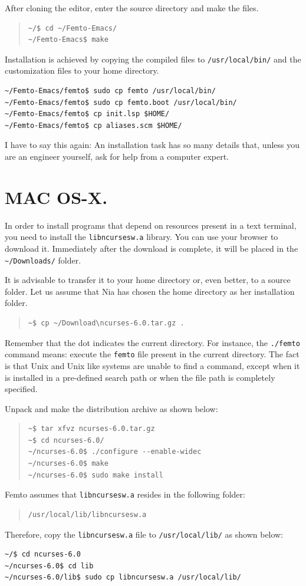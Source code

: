 \documentclass[a4paper,12pt]{book}
\begin{document}
After cloning the editor, enter the source directory
and make the files.
\begin{quote}
\begin{verbatim}
~/$ cd ~/Femto-Emacs/ 
~/Femto-Emacs$ make
\end{verbatim}
\end{quote}
Installation is achieved by copying the
compiled files to \verb|/usr/local/bin/| and
the customization files to your home directory.
\begin{verbatim}
~/Femto-Emacs/femto$ sudo cp femto /usr/local/bin/ 
~/Femto-Emacs/femto$ sudo cp femto.boot /usr/local/bin/ 
~/Femto-Emacs/femto$ cp init.lsp $HOME/ 
~/Femto-Emacs/femto$ cp aliases.scm $HOME/
\end{verbatim}

I have to say this again: An installation
task has so many details that, unless you
are an engineer yourself, 
ask for help from a computer expert.

\section{MAC OS-X.}
In order to install programs that depend
on resources present in a text terminal,
you need to install the
\verb|libncursesw.a| library. You can
use your browser to download it.
Immediately after the download is complete, it will be
placed in the \verb|~/Downloads/| folder.

It is advisable to transfer it to your
home directory or, even better, to a
source folder. Let us assume that Nia
has chosen the home directory as her
installation folder.
\begin{quote}
\begin{verbatim}
~$ cp ~/Download\ncurses-6.0.tar.gz .
\end{verbatim}
\end{quote}
Remember that the dot indicates the current
directory. For instance, the \verb|./femto|
command means: execute the \verb|femto| file
present in the current directory.
The fact is that Unix and Unix like systems
are unable to find a command, except when
it is installed in a pre-defined search
path or when the file path is completely
specified.

Unpack and make the distribution archive as shown below:
\begin{quote}
\begin{verbatim}
~$ tar xfvz ncurses-6.0.tar.gz
~$ cd ncurses-6.0/
~/ncurses-6.0$ ./configure --enable-widec
~/ncurses-6.0$ make
~/ncurses-6.0$ sudo make install
\end{verbatim}
\end{quote}
Femto assumes that  \verb|libncursesw.a|
resides in the following folder:
\begin{quote}
\begin{verbatim}
/usr/local/lib/libncursesw.a 
\end{verbatim}
\end{quote}
Therefore, copy the \verb|libncursesw.a| file
to \verb|/usr/local/lib/| as shown below:
\begin{verbatim}
~/$ cd ncurses-6.0 
~/ncurses-6.0$ cd lib 
~/ncurses-6.0/lib$ sudo cp libncursesw.a /usr/local/lib/
\end{verbatim}
\end{document}
